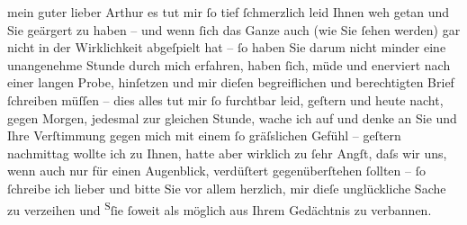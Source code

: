 \pstart{}mein guter lieber Arthur\pend\vspace{0.5em}
\pstart
           es tut mir{ }ſo tief{ }ſchmerzlich leid Ihnen weh getan und Sie geärgert zu haben – und
               wenn{ }ſich das Ganze auch (wie Sie{ }ſehen werden) gar nicht in der Wirklichkeit
               abgeſpielt hat –{ }ſo haben Sie darum nicht minder eine unangenehme Stunde durch mich
               erfahren, haben{ }ſich, {\pb}müde und
               enerviert nach einer langen Probe, hinſetzen und
               mir dieſen begreiflichen und berechtigten Brief{ }ſchreiben müſſen – dies alles tut mir{ }ſo furchtbar leid, geſtern und heute nacht, gegen Morgen, jedesmal zur gleichen
               Stunde, wache ich auf und denke an Sie und Ihre Verſtimmung gegen mich mit einem{ }ſo
                  {\pb}gräſslichen Gefühl – geſtern
               nachmittag wollte ich zu Ihnen, hatte aber wirklich zu{ }ſehr Angſt, daſs wir uns, wenn
               auch nur für einen Augenblick, verdüſtert gegenüberſtehen{ }ſollten –{ }ſo{ }ſchreibe ich
               lieber und bitte Sie vor allem herzlich, mir dieſe unglückliche Sache zu verzeihen
                  und{ }{\pb}\substVorne{}\textsuperscript{S}\substDazwischen{}ſ\substHinten{}ie{ }ſoweit als möglich aus Ihrem Gedächtnis zu verbannen.\pend
           
